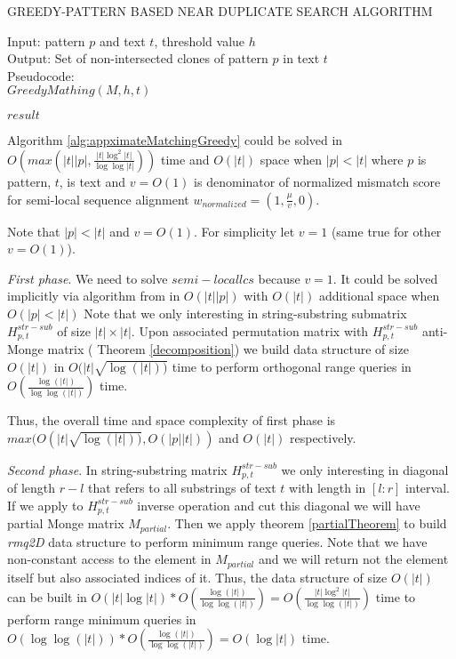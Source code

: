 \begin{algorithm}[H]
\caption{GREEDY-PATTERN BASED NEAR DUPLICATE
SEARCH ALGORITHM}
\label{alg:appximateMatchingGreedy}
Input: pattern $p$ and text $t$, threshold value $h$\\
Output: Set of non-intersected clones of pattern $p$ in text $t$\\
Pseudocode:\\
$GreedyMathing(M,h,t)$
\begin{algorithmic}[1]

\RETURN $result$
\end{algorithmic}
\end{algorithm}


\begin{theorem}
Algorithm \ref{alg:appximateMatchingGreedy} could  be solved in
$O(max(|t||p|,\frac{|t| \log^2 |t|}{\log \log |t|} ))$ time and $O(|t| )$ space when $|p|<|t|$ where $p$ is pattern, $t$, is text and $v=O(1)$ is denominator of normalized mismatch score for semi-local sequence alignment
$w_{normalized} = (1,\frac{\mu}{v},0)$.
\end{theorem}
Note that $|p|<|t|$ and $v=O(1)$.
For simplicity let $v=1$ (same true for other $v=O(1)$).

\emph{First phase}. 
We need to solve $semi-local lcs$ because $v=1$.
It could be solved implicitly via algorithm from \cite{.}
in $O(|t||p|)$ with $O(|t|)$ additional space when $O(|p|<|t|)$
Note that we only interesting in string-substring submatrix $H^{str-sub}_{p,t}$ of size $|t| \times |t|$.
Upon associated permutation matrix with $H^{str-sub}_{p,t}$ anti-Monge matrix ( Theorem \ref{decomposition})  we build data structure
of size $O(|t|)$ in $O(|t|\sqrt{\log(|t|))}$ time to 
perform  orthogonal range queries in $O(\frac{\log (|t|)}{\log \log (|t|)})$ time.

Thus, the overall time and space complexity of first phase 
is $max(O(|t|  \sqrt{\log(|t|))},O(|p||t|))$ and
$O(|t|)$ respectively.

\emph{Second phase}.
In string-substring matrix $H^{str-sub}_{p,t}$ we only interesting in diagonal of length $r-l$ that refers to all substrings of text $t$ with length in $[l:r]$ interval. 
If we apply to  $H^{str-sub}_{p,t}$ inverse operation and cut this diagonal we will have partial Monge matrix $M_{partial}$.
Then we apply theorem  \ref{partialTheorem} to build 
\emph{rmq2D} data structure to perform minimum range queries.
Note that we have non-constant access to the element in $M_{partial}$ and we will return not the element itself but also associated indices of it.
Thus, the data structure of size 
$O(|t|)$
 can be built in $O(|t| \log |t|)* O(\frac{\log (|t|)}{\log \log (|t|)}) = O(\frac{|t|\log^2 |t|}{\log \log (|t|)}) $ time
to perform range minimum queries in $O(\log \log (|t|))*O(\frac{\log (|t|)}{\log \log (|t|)})=O(\log |t|)$ time.

